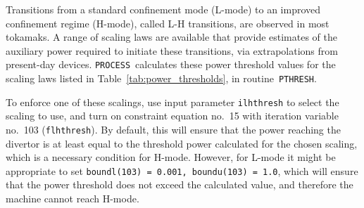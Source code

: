 \documentclass[11pt,a4paper]{report}
\newcommand{\process}{\mbox{\texttt{PROCESS}}}
\begin{document}
Transitions from a standard confinement mode (L-mode) to an improved
confinement regime (H-mode), called L-H transitions, are observed in most
tokamaks. A range of scaling laws are available that provide estimates of the
auxiliary power required to initiate these transitions, via extrapolations
from present-day devices. \process\ calculates these power threshold values
for the scaling laws listed in Table~\ref{tab:power_thresholds}, in
routine~\texttt{PTHRESH}.

To enforce one of these scalings, use input parameter \texttt{ilhthresh} to
select the scaling to use, and turn on constraint equation no.\ 15 with
iteration variable no.\ 103 (\texttt{flhthresh}). By default, this will ensure
that the power reaching the divertor is at least equal to the threshold power
calculated for the chosen scaling, which is a necessary condition for
H-mode. However, for L-mode it might be appropriate to set \texttt{boundl(103)
  = 0.001, boundu(103) = 1.0}, which will ensure that the power threshold does
not exceed the calculated value, and therefore the machine cannot reach
H-mode.
\end{document}
